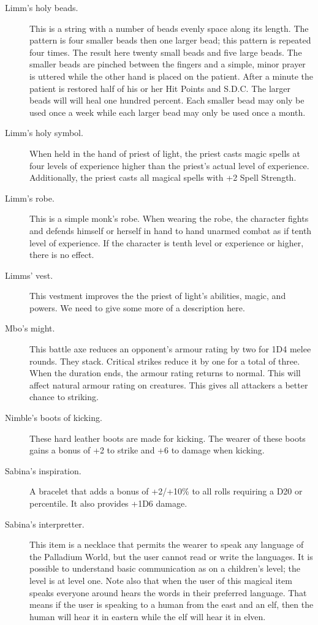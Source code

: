 \begin{description}
\item[Limm's holy beads.]
This is a string with a number of beads evenly
space along its length.
The pattern is four smaller beads then one larger
bead; this pattern is repeated four times.
The result here twenty small beads and five large
beads.
The smaller beads are pinched between the fingers and
a simple, minor prayer is uttered while the other hand
is placed on the patient.
After a minute the patient is restored half of his or
her Hit Points and S.D.C.
The larger beads will will heal one hundred percent.
Each smaller bead may only be used once a week while
each larger bead may only be used once a month.

\item[Limm's holy symbol.] When held in the hand of
priest of light, the priest casts magic spells at
four levels of experience higher than the priest's
actual level of experience.
Additionally, the priest casts all magical spells
with +2 Spell Strength.

\item[Limm's robe.]
This is a simple monk's robe.
When wearing the robe, the character fights
and defends himself or herself in hand to hand
unarmed combat as if tenth level of experience.
If the character is tenth level or experience 
or higher, there is no effect.

\item[Limms' vest.] This vestment improves the
the priest of light's abilities, magic, and powers.
We need to give some more of a description here.

\item[Mbo's might.]
This battle axe reduces an opponent's armour rating by
two for 1D4 melee rounds.
They stack.
Critical strikes reduce it by one for a total of three.
When the duration ends,
the armour rating returns to normal.
This will affect natural armour rating on creatures.
This gives all attackers a better chance to striking.

\item[Nimble's boots of kicking.]
These hard leather boots are made for kicking.
The wearer of these boots gains a bonus of +2 to strike
and +6 to damage when
kicking.

\item[Sabina's inspiration.]
A bracelet that adds a bonus of +2/+10\% to all
rolls requiring a D20 or percentile.
It also provides +1D6 damage.

\item[Sabina's interpretter.]
This item is a necklace that permits the wearer to speak
any language of the Palladium World,
but the user cannot read or write the languages.
It is possible to understand basic communication as on
a children's level;
the level is at level one.
Note also that when the user of this magical item speaks
everyone around hears the words in their preferred language.
That means if the user is speaking to a human from the east
and an elf, then the human will hear it in eastern while the
elf will hear it in elven.


\end{description}
